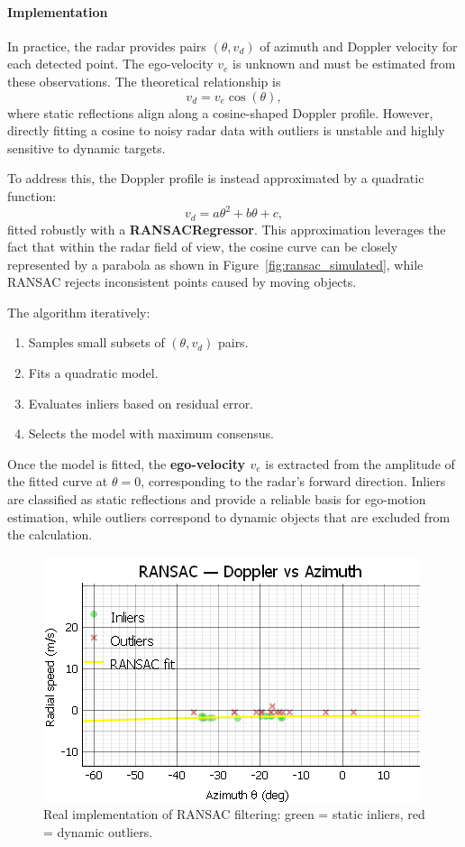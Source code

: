 \paragraph{Implementation}
In practice, the radar provides pairs $(\theta, v_d)$ of azimuth and Doppler velocity for each detected point.  
The ego-velocity $v_e$ is unknown and must be estimated from these observations.  
The theoretical relationship is
\[
v_d = v_e \cos(\theta),
\]
where static reflections align along a cosine-shaped Doppler profile.  
However, directly fitting a cosine to noisy radar data with outliers is unstable and highly sensitive to dynamic targets.  

To address this, the Doppler profile is instead approximated by a quadratic function:
\[
v_d = a\theta^2 + b\theta + c,
\]
fitted robustly with a \textbf{RANSACRegressor}.  
This approximation leverages the fact that within the radar field of view, the cosine curve can be closely represented by a parabola as shown in Figure~\ref{fig:ransac_simulated}, while RANSAC rejects inconsistent points caused by moving objects.  

The algorithm iteratively:
\begin{enumerate}
    \item Samples small subsets of $(\theta, v_d)$ pairs.
    \item Fits a quadratic model.
    \item Evaluates inliers based on residual error.
    \item Selects the model with maximum consensus.
\end{enumerate}

Once the model is fitted, the \textbf{ego-velocity $v_e$} is extracted from the amplitude of the fitted curve at $\theta = 0$, corresponding to the radar’s forward direction.  
Inliers are classified as static reflections and provide a reliable basis for ego-motion estimation, while outliers correspond to dynamic objects that are excluded from the calculation.

\begin{figure}[!htbp]
    \centering
    \includegraphics[width=0.9\linewidth]{images/RANSAC_movingTarget_wPtCloud.png}
    \caption{Real implementation of RANSAC filtering: green = static inliers, red = dynamic outliers.}
    \label{fig:ransac_real_static_dynamic}
\end{figure}

